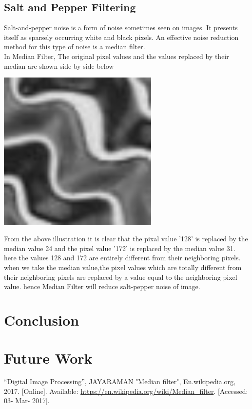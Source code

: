 \documentclass[journal]{IEEEtran}
\begin{document}
	\subsection{\textbf{Salt and Pepper Filtering}}
	Salt-and-pepper noise is a form of noise sometimes seen on images. It presents itself as sparsely occurring white and black pixels. An effective noise reduction method for this type of noise is a median filter.\\
	  In Median Filter,
	 The original pixel values and the values replaced by their median are shown side by side below\\
	\begin{minipage}{\linewidth}
		\centering
		\includegraphics[width = 80mm]{1}
	\end{minipage} 
		
	From the above illustration it is clear that the pixal value '128' is replaced by the median value 24 and the pixel value '172' is replaced by the median value 31. here the values 128 and 172 are entirely different from their neighboring pixels. when we take the median value,the pixel values which are totally different from their neighboring pixels are replaced by a value equal to the neighboring pixel value. hence Median Filter will reduce salt-pepper noise of image. 
	
	\ifCLASSOPTIONcaptionsoff
	\newpage
	\fi
	
	
	
	\section{\textbf{Conclusion}}
		 
	
	
	
    \section{\textbf{Future Work}}
    
	
	
	\begin{thebibliography}{1}
	“Digital Image Processing”, JAYARAMAN
	"Median filter", En.wikipedia.org, 2017. [Online]. Available: \url{https://en.wikipedia.org/wiki/Median_filter}. [Accessed: 03- Mar- 2017].

	
	\end{thebibliography}
	
	
	
\end{document}
